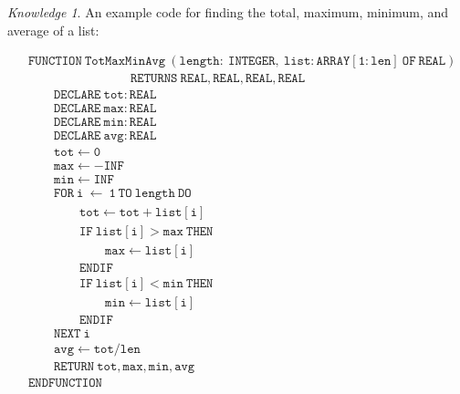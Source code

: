 \documentclass[8pt]{article}
\theoremstyle{remark}
\newtheorem{knowledge}{Knowledge}[subsection]
\begin{document}
            \begin{knowledge}
                An example code for finding the total, maximum, minimum, and average of a list:

                \begin{align*}
                    &\mathtt{FUNCTION\ TotMaxMinAvg\ (length:\ INTEGER,\ list:ARRAY [1:len]\ OF\ REAL)}\\
                    &\qquad \qquad \qquad \qquad \mathtt{RETURNS\ REAL, REAL, REAL, REAL}\\
                    &\qquad \mathtt{DECLARE\ tot:REAL}\\
                    &\qquad \mathtt{DECLARE\ max:REAL}\\
                    &\qquad \mathtt{DECLARE\ min:REAL}\\
                    &\qquad \mathtt{DECLARE\ avg:REAL}\\
                    &\qquad \mathtt{tot \leftarrow 0}\\
                    &\qquad \mathtt{max \leftarrow -INF}\\
                    &\qquad \mathtt{min \leftarrow INF}\\
                    &\qquad \mathtt{FOR\ i\ \leftarrow\ 1\ TO\ length\ DO}\\
                    &\qquad \qquad \mathtt{tot \leftarrow tot + list[i]}\\
                    &\qquad \qquad \mathtt{IF\ list[i] > max\ THEN}\\
                    &\qquad \qquad \qquad \mathtt{max \leftarrow list[i]}\\
                    &\qquad \qquad \mathtt{ENDIF}\\
                    &\qquad \qquad \mathtt{IF\ list[i] < min\ THEN}\\
                    &\qquad \qquad \qquad \mathtt{min \leftarrow list[i]}\\
                    &\qquad \qquad \mathtt{ENDIF}\\
                    &\qquad \mathtt{NEXT\ i}\\
                    &\qquad \mathtt{avg \leftarrow tot / len}\\
                    &\qquad \mathtt{RETURN\ tot, max, min, avg}\\
                    &\mathtt{ENDFUNCTION}
                \end{align*}
            \end{knowledge}
\end{document}

